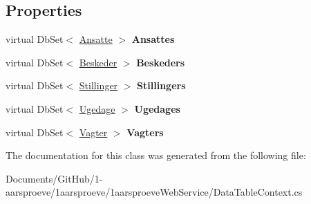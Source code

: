 \subsection*{Properties}
\begin{DoxyCompactItemize}
\item 
\hypertarget{class__1aarsproeve_web_service_1_1_data_table_context_ac1e89039217d1df6c91e0f123f218c7c}{}virtual Db\+Set$<$ \hyperlink{class__1aarsproeve_web_service_1_1_ansatte}{Ansatte} $>$ {\bfseries Ansattes}\label{class__1aarsproeve_web_service_1_1_data_table_context_ac1e89039217d1df6c91e0f123f218c7c}

\item 
\hypertarget{class__1aarsproeve_web_service_1_1_data_table_context_a7051501568ece3045b86ebb7bdee71ee}{}virtual Db\+Set$<$ \hyperlink{class__1aarsproeve_web_service_1_1_beskeder}{Beskeder} $>$ {\bfseries Beskeders}\label{class__1aarsproeve_web_service_1_1_data_table_context_a7051501568ece3045b86ebb7bdee71ee}

\item 
\hypertarget{class__1aarsproeve_web_service_1_1_data_table_context_ac223333739318f92aba0ce240c75f0f3}{}virtual Db\+Set$<$ \hyperlink{class__1aarsproeve_web_service_1_1_stillinger}{Stillinger} $>$ {\bfseries Stillingers}\label{class__1aarsproeve_web_service_1_1_data_table_context_ac223333739318f92aba0ce240c75f0f3}

\item 
\hypertarget{class__1aarsproeve_web_service_1_1_data_table_context_af31f34657d1ffefffe41e32453ed0dd3}{}virtual Db\+Set$<$ \hyperlink{class__1aarsproeve_web_service_1_1_ugedage}{Ugedage} $>$ {\bfseries Ugedages}\label{class__1aarsproeve_web_service_1_1_data_table_context_af31f34657d1ffefffe41e32453ed0dd3}

\item 
\hypertarget{class__1aarsproeve_web_service_1_1_data_table_context_ae6167c3420f425c11b08efbec90b3c49}{}virtual Db\+Set$<$ \hyperlink{class__1aarsproeve_web_service_1_1_vagter}{Vagter} $>$ {\bfseries Vagters}\label{class__1aarsproeve_web_service_1_1_data_table_context_ae6167c3420f425c11b08efbec90b3c49}

\end{DoxyCompactItemize}


The documentation for this class was generated from the following file\+:\begin{DoxyCompactItemize}
\item 
Documents/\+Git\+Hub/1-\/aarsproeve/1aarsproeve/1aarsproeve\+Web\+Service/Data\+Table\+Context.\+cs\end{DoxyCompactItemize}
